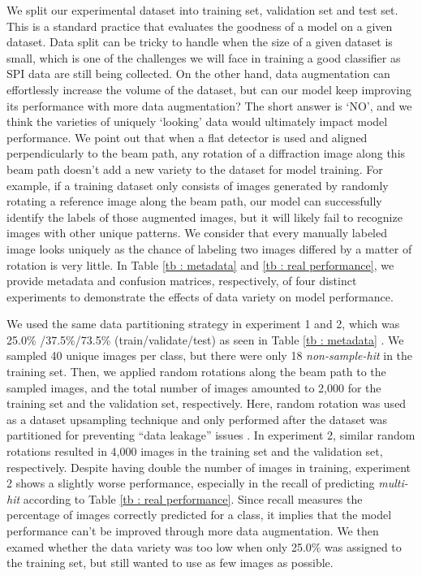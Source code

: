 We split our experimental dataset into training set, validation set and test
set.  This is a standard practice that evaluates the goodness of a model on a
given dataset.  Data split can be tricky to handle when the size of a given
dataset is small, which is one of the challenges we will face in training a good
classifier as SPI data are still being collected.  On the other hand, data
augmentation can effortlessly increase the volume of the dataset, but can our
model keep improving its performance with more data augmentation?  The short
answer is `NO', and we think the varieties of uniquely `looking' data would
ultimately impact model performance.  We point out that when a flat detector is
used and aligned perpendicularly to the beam path, any rotation of a diffraction
image along this beam path doesn't add a new variety to the dataset for model
training.  For example, if a training dataset only consists of images generated
by randomly rotating a reference image along the beam path, our model can
successfully identify the labels of those augmented images, but it will likely
fail to recognize images with other unique patterns.  We consider that every
manually labeled image looks uniquely as the chance of labeling two images
differed by a matter of rotation is very little.  In Table \ref{tb : metadata}
and \ref{tb : real performance}, we provide metadata and confusion matrices,
respectively, of four distinct experiments to demonstrate the effects of data
variety on model performance.  

We used the same data partitioning strategy in experiment 1 and 2, which was
25.0\% /37.5\%/73.5\% (train/validate/test) as seen in Table \ref{tb : metadata}
.  We sampled 40 unique images per class, but there were only 18
\textit{non-sample-hit} in the training set.  Then, we applied random rotations
along the beam path to the sampled images, and the total number of images
amounted to 2,000 for the training set and the validation set, respectively.
Here, random rotation was used as a dataset upsampling technique and only
performed after the dataset was partitioned for preventing ``data leakage''
issues \cite{kapoorLeakageReproducibilityCrisis2022}.  In experiment 2, similar
random rotations resulted in 4,000 images in the training set and the validation
set, respectively.  Despite having double the number of images in training,
experiment 2 shows a slightly worse performance, especially in the recall of
predicting \textit{multi-hit} according to Table \ref{tb : real performance}.
Since recall measures the percentage of images correctly predicted for a class,
it implies that the model performance can't be improved through more data
augmentation.  We then examed whether the data variety was too low when only
25.0\% was assigned to the training set, but still wanted to use as few images
as possible.  

